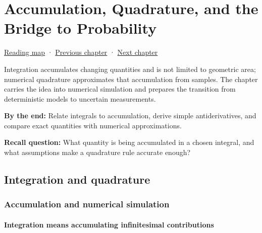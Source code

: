 \chapter{Accumulation, Quadrature, and the Bridge to Probability}\label{02-foundations-ii-ch022-accumulation-quadrature-and-the-bridge-to-probability}\hypertarget{02-foundations-ii-ch022}{}\label{stagechapter:02-foundations-ii-ch022}

\hypertarget{02-foundations-ii-ch022-accumulation-quadrature-and-the-bridge-to-probability}{}

\hyperref[volume-reading-map]{Reading map} · \hyperref[02-foundations-ii-ch021-multivariable-derivatives-and-sensitivity]{Previous chapter} · \hyperref[02-foundations-ii-ch023-probability-models-and-measurement-error]{Next chapter}

Integration accumulates changing quantities and is not limited to geometric area; numerical quadrature approximates that accumulation from samples. The chapter carries the idea into numerical simulation and prepares the transition from deterministic models to uncertain measurements.

\textbf{By the end:} Relate integrals to accumulation, derive simple antiderivatives, and compare exact quantities with numerical approximations.

\textbf{Recall question:} What quantity is being accumulated in a chosen integral, and what assumptions make a quadrature rule accurate enough?

\section{Integration and quadrature}\label{02-foundations-ii-ch022-integration-and-quadrature}

\hypertarget{02-foundations-ii-ch022-integration-and-quadrature}{}

\subsection{Accumulation and numerical simulation}\label{02-foundations-ii-ch022-accumulation-and-numerical-simulation}

\hypertarget{02-foundations-ii-ch022-accumulation-and-numerical-simulation}{}

\subsubsection{Integration means accumulating infinitesimal contributions}\label{02-foundations-ii-ch022-integration-means-accumulating-infinitesimal-contributions}

